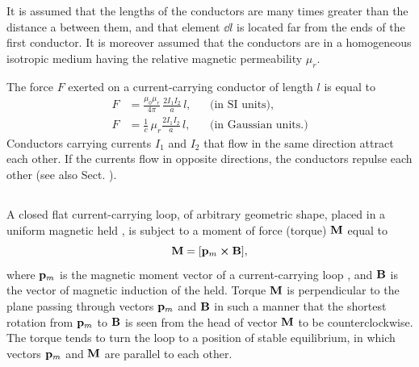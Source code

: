 It is assumed that the lengths of the conductors are many times greater than the distance a between them, and that element $\dd l$ is located far from the ends of the first conductor. It is moreover assumed that the conductors are in a homogeneous isotropic medium having the relative magnetic permeability $\mu_{r}$.

The force ${F}$ exerted on a current-carrying conductor of length $l$ is equal to
\begin{align*}%
F & = \frac{\mu_{0} \mu_{r}}{4 \pi}\, \frac{2I_{1}I_{2}}{a} \, l, &&  \text{(in SI units),} \\
F & =  \frac{1}{c} \, \mu_{r} \frac{2I_{1}I_{2}}{a} \, l, &&  \text{(in Gaussian units.)}
\end{align*}
Conductors carrying currents $I_{1}$ and $I_{2}$ that flow in the same direction attract each other. If the currents flow in opposite directions, the conductors repulse each other (see also Sect. ).

\subsection{}\label{23.4.2} A closed flat current-carrying loop, of arbitrary geometric shape, placed in a uniform magnetic held , is subject to a moment of force (torque) $\vb{M}$ equal to
\begin{equation*}%
\vb{M} = [\vb{p}_{m} \cross \vb{B}],
\end{equation*}
where $\vb{p}_{m}$ is the magnetic moment vector of a current-carrying loop , and $\vb{B}$ is the vector of magnetic induction  of the held. Torque $\vb{M}$ is perpendicular to the plane passing through vectors $\vb{p}_{m}$ and $\vb{B}$ in such a manner that the shortest rotation from $\vb{p}_{m}$ to $\vb{B}$ is seen from the head of vector $\vb{M}$ to be counterclockwise. The torque tends to turn the loop to a position of stable equilibrium, in which vectors $\vb{p}_{m}$ and $\vb{M}$ are parallel to each other.

